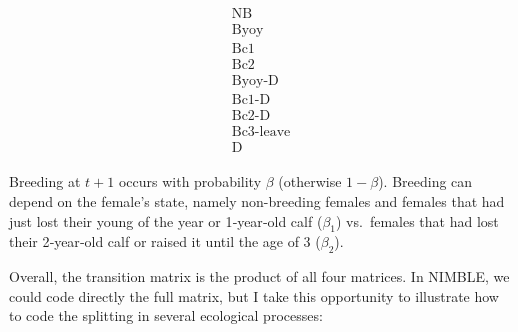 \documentclass[
  12pt,
]{krantz}
\begin{document}
\[\begin{matrix}
\begin{matrix}
\text{NB} \\
\text{Byoy} \\
\text{Bc1} \\
\text{Bc2} \\
\text{Byoy-D} \\
\text{Bc1-D} \\
\text{Bc2-D} \\
\text{Bc3-leave} \\
\text{D}
\end{matrix}
\end{matrix}
\]

Breeding at \(t+1\) occurs with probability \(\beta\) (otherwise \(1−\beta\)). Breeding can depend on the female's state, namely non-breeding females and females that had just lost their young of the year or 1‐year‐old calf (\(\beta_1\)) vs.~females that had lost their 2‐year‐old calf or raised it until the age of 3 (\(\beta_2\)).

Overall, the transition matrix is the product of all four matrices. In NIMBLE, we could code directly the full matrix, but I take this opportunity to illustrate how to code the splitting in several ecological processes:
\end{document}
